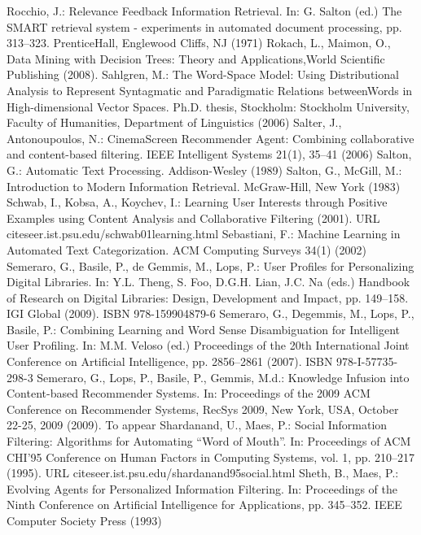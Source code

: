 \begin{thebibliography}{110}
Rocchio, J.: Relevance Feedback Information Retrieval. In: G. Salton (ed.) The SMART retrieval system - experiments in automated document processing, pp. 313–323. PrenticeHall, Englewood Cliffs, NJ (1971)
Rokach, L., Maimon, O., Data Mining with Decision Trees: Theory and Applications,World Scientific Publishing (2008).
Sahlgren, M.: The Word-Space Model: Using Distributional Analysis to Represent Syntagmatic and Paradigmatic Relations betweenWords in High-dimensional Vector Spaces. Ph.D. thesis, Stockholm: Stockholm University, Faculty of Humanities, Department of Linguistics (2006)
Salter, J., Antonoupoulos, N.: CinemaScreen Recommender Agent: Combining collaborative and content-based filtering. IEEE Intelligent Systems 21(1), 35–41 (2006)
Salton, G.: Automatic Text Processing. Addison-Wesley (1989)
Salton, G., McGill, M.: Introduction to Modern Information Retrieval. McGraw-Hill, New York (1983)
Schwab, I., Kobsa, A., Koychev, I.: Learning User Interests through Positive Examples using Content Analysis and Collaborative Filtering (2001). URL citeseer.ist.psu.edu/schwab01learning.html
Sebastiani, F.: Machine Learning in Automated Text Categorization. ACM Computing Surveys 34(1) (2002)
Semeraro, G., Basile, P., de Gemmis, M., Lops, P.: User Profiles for Personalizing Digital Libraries. In: Y.L. Theng, S. Foo, D.G.H. Lian, J.C. Na (eds.) Handbook of Research on Digital Libraries: Design, Development and Impact, pp. 149–158. IGI Global (2009). ISBN 978-159904879-6
Semeraro, G., Degemmis, M., Lops, P., Basile, P.: Combining Learning and Word Sense Disambiguation for Intelligent User Profiling. In: M.M. Veloso (ed.) Proceedings of the 20th International Joint Conference on Artificial Intelligence, pp. 2856–2861 (2007). ISBN 978-I-57735-298-3
Semeraro, G., Lops, P., Basile, P., Gemmis, M.d.: Knowledge Infusion into Content-based Recommender Systems. In: Proceedings of the 2009 ACM Conference on Recommender Systems, RecSys 2009, New York, USA, October 22-25, 2009 (2009). To appear
Shardanand, U., Maes, P.: Social Information Filtering: Algorithms for Automating “Word of Mouth”. In: Proceedings of ACM CHI’95 Conference on Human Factors in Computing Systems, vol. 1, pp. 210–217 (1995). URL citeseer.ist.psu.edu/shardanand95social.html
Sheth, B., Maes, P.: Evolving Agents for Personalized Information Filtering. In: Proceedings of the Ninth Conference on Artificial Intelligence for Applications, pp. 345–352. IEEE Computer Society Press (1993)

\end{thebibliography}
